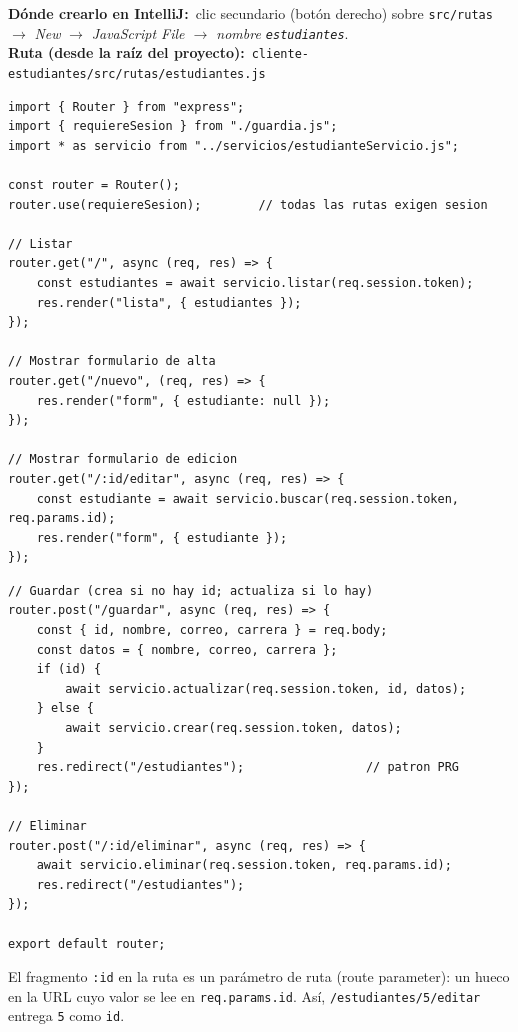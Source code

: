\documentclass[11pt]{article}
\newcommand{\dondecrear}[3]{\begin{ubic}{\footnotesize\textbf{\color{ndverdeo}D\'onde crearlo en IntelliJ:}~clic secundario (bot\'on derecho) sobre \texttt{#1} $\rightarrow$ \emph{New} $\rightarrow$ \emph{#2}.\\[2pt]\textbf{\color{ndverdeo}Ruta (desde la ra\'iz del proyecto):}~\texttt{#3}}\end{ubic}\nobreak\vspace{3pt}}
\begin{document}
\dondecrear{src/rutas}{JavaScript File $\rightarrow$ nombre \texttt{estudiantes}}{cliente-estudiantes/src/rutas/estudiantes.js}
\begin{cajacodigo}
\begin{lstlisting}[style=js]
import { Router } from "express";
import { requiereSesion } from "./guardia.js";
import * as servicio from "../servicios/estudianteServicio.js";

const router = Router();
router.use(requiereSesion);        // todas las rutas exigen sesion

// Listar
router.get("/", async (req, res) => {
	const estudiantes = await servicio.listar(req.session.token);
	res.render("lista", { estudiantes });
});

// Mostrar formulario de alta
router.get("/nuevo", (req, res) => {
	res.render("form", { estudiante: null });
});

// Mostrar formulario de edicion
router.get("/:id/editar", async (req, res) => {
	const estudiante = await servicio.buscar(req.session.token, req.params.id);
	res.render("form", { estudiante });
});
\end{lstlisting}
\end{cajacodigo}
\vspace{2pt}
\begin{cajacodigo}
\begin{lstlisting}[style=js]
// Guardar (crea si no hay id; actualiza si lo hay)
router.post("/guardar", async (req, res) => {
	const { id, nombre, correo, carrera } = req.body;
	const datos = { nombre, correo, carrera };
	if (id) {
		await servicio.actualizar(req.session.token, id, datos);
	} else {
		await servicio.crear(req.session.token, datos);
	}
	res.redirect("/estudiantes");                 // patron PRG
});

// Eliminar
router.post("/:id/eliminar", async (req, res) => {
	await servicio.eliminar(req.session.token, req.params.id);
	res.redirect("/estudiantes");
});

export default router;
\end{lstlisting}
\end{cajacodigo}
\vspace{2pt}
El fragmento \texttt{:\allowbreak{}id} en la ruta es un parámetro de ruta (route parameter): un hueco en la URL cuyo valor se lee en \texttt{req.\allowbreak{}params.\allowbreak{}id}. Así, \texttt{/estudiantes/\allowbreak{}5/\allowbreak{}editar} entrega \texttt{5} como \texttt{id}.
\end{document}
